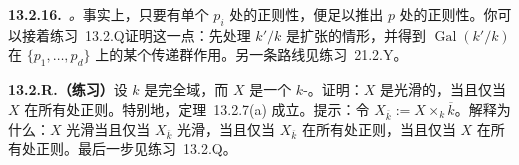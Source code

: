 \textbf{13.2.16.}\ \emph{\trhRemark{}。}\quad 事实上，只要有单个 $p_i$ 处的正则性，便足以推出 $p$ 处的正则性。你可以接着\mbox{练习~13.2.Q}证明这一点：先处理 $k'/k$ 是\trGalois{}扩张的情形，并得到 $\operatorname{Gal}(k'/k)$ 在 $\{p_1,\dots,p_d\}$ 上的某个传递群作用。另一条路线见\mbox{练习~21.2.Y}。

\textbf{13.2.R.（练习）}\quad 设 $k$ 是完全域，而 $X$ 是一个\trFiniteType{} $k$-\trScheme。证明：$X$ 是光滑的，当且仅当 $X$ 在所有\trClosedPoint{}处正则。特别地，定理~13.2.7(a) 成立。提示：令 $X_{\overline{k}}:=X\times_k\overline{k}$。解释为什么：$X$ 光滑当且仅当 $X_{\overline{k}}$ 光滑，当且仅当 $X_{\overline{k}}$ 在所有\trClosedPoint{}处正则，当且仅当 $X$ 在所有\trClosedPoint{}处正则。最后一步见\mbox{练习~13.2.Q}。
